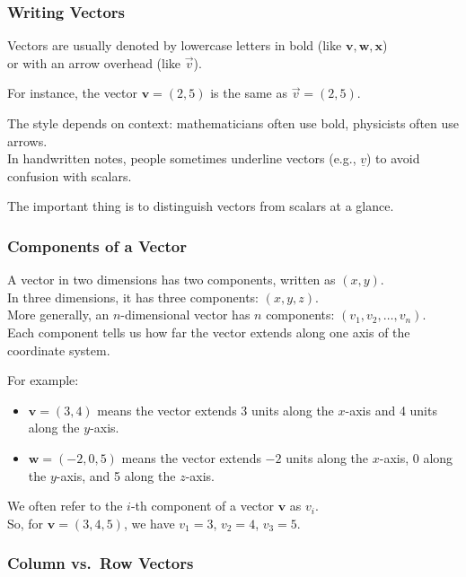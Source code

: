 \documentclass[
  letterpaper,
  DIV=11,
  numbers=noendperiod]{scrreprt}
\providecommand{\tightlist}{%
  \setlength{\itemsep}{0pt}\setlength{\parskip}{0pt}}
\begin{document}
\subsubsection{Writing Vectors}\label{writing-vectors}

Vectors are usually denoted by lowercase letters in bold (like
\(\mathbf{v}, \mathbf{w}, \mathbf{x}\))\\
or with an arrow overhead (like \(\vec{v}\)).

For instance, the vector \(\mathbf{v} = (2, 5)\) is the same as
\(\vec{v} = (2, 5)\).

The style depends on context: mathematicians often use bold, physicists
often use arrows.\\
In handwritten notes, people sometimes underline vectors (e.g.,
\(\underline{v}\)) to avoid confusion with scalars.

The important thing is to distinguish vectors from scalars at a glance.

\subsubsection{Components of a Vector}\label{components-of-a-vector}

A vector in two dimensions has two components, written as \((x, y)\).\\
In three dimensions, it has three components: \((x, y, z)\).\\
More generally, an \(n\)-dimensional vector has \(n\) components:
\((v_1, v_2, \ldots, v_n)\).\\
Each component tells us how far the vector extends along one axis of the
coordinate system.

For example:

\begin{itemize}
\tightlist
\item
  \(\mathbf{v} = (3, 4)\) means the vector extends 3 units along the
  \(x\)-axis and 4 units along the \(y\)-axis.
\item
  \(\mathbf{w} = (-2, 0, 5)\) means the vector extends \(-2\) units
  along the \(x\)-axis, \(0\) along the \(y\)-axis, and 5 along the
  \(z\)-axis.
\end{itemize}

We often refer to the \(i\)-th component of a vector \(\mathbf{v}\) as
\(v_i\).\\
So, for \(\mathbf{v} = (3, 4, 5)\), we have \(v_1 = 3\), \(v_2 = 4\),
\(v_3 = 5\).

\subsubsection{Column vs.~Row Vectors}\label{column-vs.-row-vectors}
\end{document}
